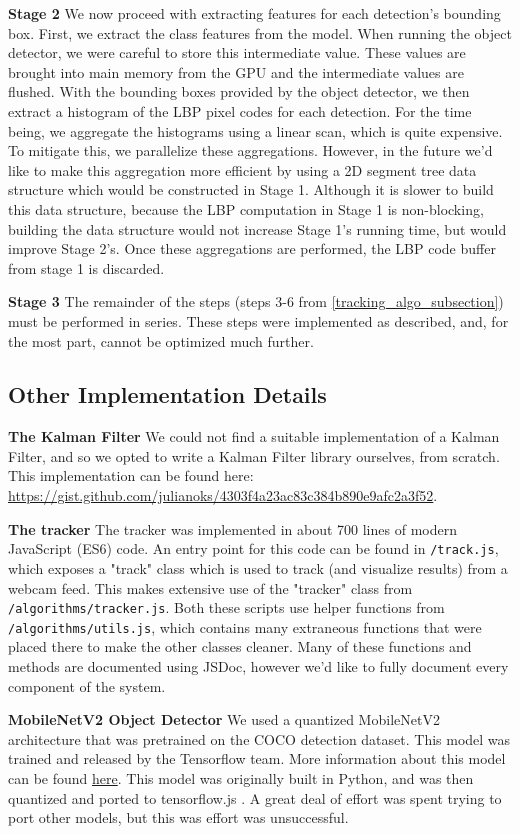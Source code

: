 \documentclass[10pt,twocolumn,letterpaper]{article}
\begin{document}
\textbf{Stage 2}
We now proceed with extracting features for each detection's bounding box.
First, we extract the class features from the model. When running the object detector, we were careful to store this intermediate value.
These values are brought into main memory from the GPU and the intermediate values are flushed.
With the bounding boxes provided by the object detector, we then extract a histogram of the LBP pixel codes for each detection.
For the time being, we aggregate the histograms using a linear scan, which is quite expensive. To mitigate this, we parallelize these aggregations.
However, in the future we'd like to make this aggregation more efficient by using a 2D segment tree data structure which would be constructed in Stage 1.
Although it is slower to build this data structure, because the LBP computation in Stage 1 is non-blocking, building the data structure would not increase Stage 1's running time, but would improve Stage 2's.
Once these aggregations are performed, the LBP code buffer from stage 1 is discarded.

\textbf{Stage 3}
The remainder of the steps (steps 3-6 from \ref{tracking_algo_subsection}) must be performed in series.
These steps were implemented as described, and, for the most part, cannot be optimized much further.


\subsection{Other Implementation Details}
\textbf{The Kalman Filter}
We could not find a suitable implementation of a Kalman Filter, and so we opted to write a Kalman Filter library ourselves, from scratch.
This implementation can be found here: \url{https://gist.github.com/julianoks/4303f4a23ac83c384b890e9afc2a3f52}.

\textbf{The tracker} The tracker was implemented in about 700 lines of modern JavaScript (ES6) code.
An entry point for this code can be found in \texttt{/track.js}, which exposes a "track" class which is used to track (and visualize results) from a webcam feed.
This makes extensive use of the "tracker" class from \texttt{/algorithms/tracker.js}.
Both these scripts use helper functions from \texttt{/algorithms/utils.js}, which contains many extraneous functions that were placed there to make the other classes cleaner.
Many of these functions and methods are documented using JSDoc, however we'd like to fully document every component of the system.

\textbf{MobileNetV2 Object Detector}
We used a quantized MobileNetV2 architecture that was pretrained on the COCO detection dataset.
This model was trained and released by the Tensorflow team. More information about this model can be found \href{https://github.com/tensorflow/models/blob/master/research/slim/nets/mobilenet_v1.md}{here}.
This model was originally built in Python, and was then quantized and ported to tensorflow.js \cite{smilkov2019tensorflowjs}.
A great deal of effort was spent trying to port other models, but this was effort was unsuccessful.
\end{document}
